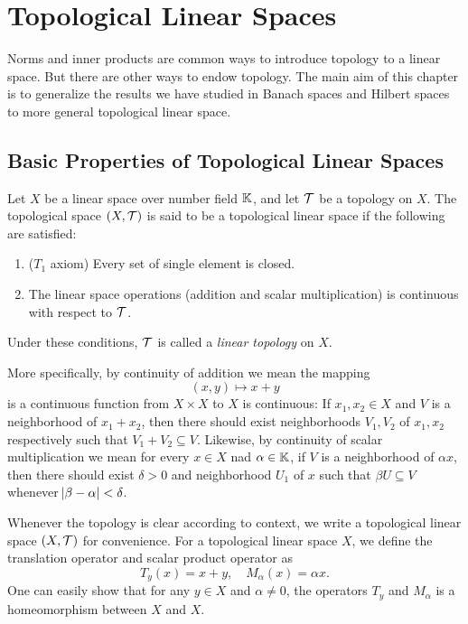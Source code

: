 \chapter{Topological Linear Spaces}
Norms and inner products are common ways to introduce topology to a linear 
space. 
But there are other ways to endow topology. 
The main aim of this chapter is to generalize the results we have studied 
in Banach spaces and Hilbert spaces to more general topological linear 
space. 

\section{Basic Properties of Topological Linear Spaces}
\begin{defn}
Let $X$ be a linear space over number field $\mathbb{K}$, and let $\mathcal{T}$ be a 
topology on $X$. 
The topological space $(X, \mathcal{T})$ is said to be a topological linear space 
if the following are satisfied: 
\begin{enumerate}
    \item ($T_1$ axiom) Every set of single element is closed. 
    \item The linear space operations (addition and scalar multiplication) 
    is continuous with respect to $\mathcal{T}$. 
\end{enumerate}
Under these conditions, $\mathcal{T}$ is called a \emph{linear topology} on $X$. 
\end{defn}

More specifically, by continuity of addition we mean the mapping 
\begin{equation*}
    (x, y) \mapsto x + y 
\end{equation*}
is a continuous function from $X \times X$ to $X$ is continuous: 
If $x_1, x_2 \in X$ and $V$ is a neighborhood of $x_1 + x_2$, then there 
should exist neighborhoods $V_1, V_2$ of $x_1, x_2$ respectively such that 
$V_1 + V_2 \subseteq V$. 
Likewise, by continuity of scalar multiplication we mean for every 
$x \in X$ nad $\alpha \in \mathbb{K}$, if $V$ is a neighborhood of $\alpha x$, 
then there should exist $\delta > 0$ and neighborhood $U_1$ of $x$ such 
that $\beta U \subseteq V$ whenever $\abs{\beta - \alpha} < \delta$. 

Whenever the topology is clear according to context, we write a topological 
linear space $(X, \mathcal{T})$ for convenience. 
For a topological linear space $X$, we define the translation operator and 
scalar product operator as 
\begin{equation*}
    T_y(x) = x + y, \quad M_\alpha(x) = \alpha x. 
\end{equation*}
One can easily show that for any $y \in X$ and $\alpha \neq 0$, the 
operators $T_y$ and $M_\alpha$ is a homeomorphism between $X$ and $X$. 


